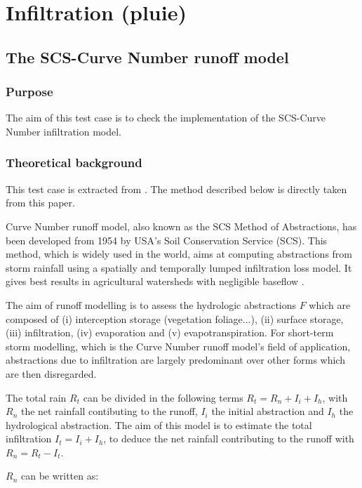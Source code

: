 \chapter{Infiltration (pluie)}
\label{chapter:pluie}

\section{The SCS-Curve Number runoff model}

\subsection{Purpose}

The aim of this test case is to check the implementation of the SCS-Curve Number
infiltration model.

\subsection{Theoretical background}

This test case is extracted from \cite{Ligier2016}.
The method described below is directly taken from this paper.

Curve Number runoff model, also known as the SCS Method of Abstractions, has
been developed from 1954 by USA’s Soil Conservation Service (SCS).
This method, which is widely used in the world, aims at computing abstractions
from storm rainfall using a spatially and temporally lumped infiltration loss model.
It gives best results in agricultural watersheds with negligible baseflow \cite{soil1972national}.

The aim of runoff modelling is to assess the hydrologic abstractions $F$ which are
composed of (i) interception storage (vegetation foliage...),
(ii) surface storage, (iii) infiltration, (iv) evaporation and
(v) evapotranspiration.
For short-term storm modelling, which is the Curve Number runoff model's field
of application, abstractions due to infiltration are largely predominant over
other forms which are then disregarded.

The total rain $R_t$ can be divided in the following terms $R_t=R_n+I_i+I_h$,
with $R_n$ the net rainfall contibuting to the runoff, $I_i$ the initial
abstraction and $I_h$ the hydrological abstraction.
The aim of this model is to estimate the total infiltration $I_t=I_i+I_h$,
to deduce the net rainfall contributing to the runoff with $R_n=R_t-I_t$.

$R_n$ can be written as:

